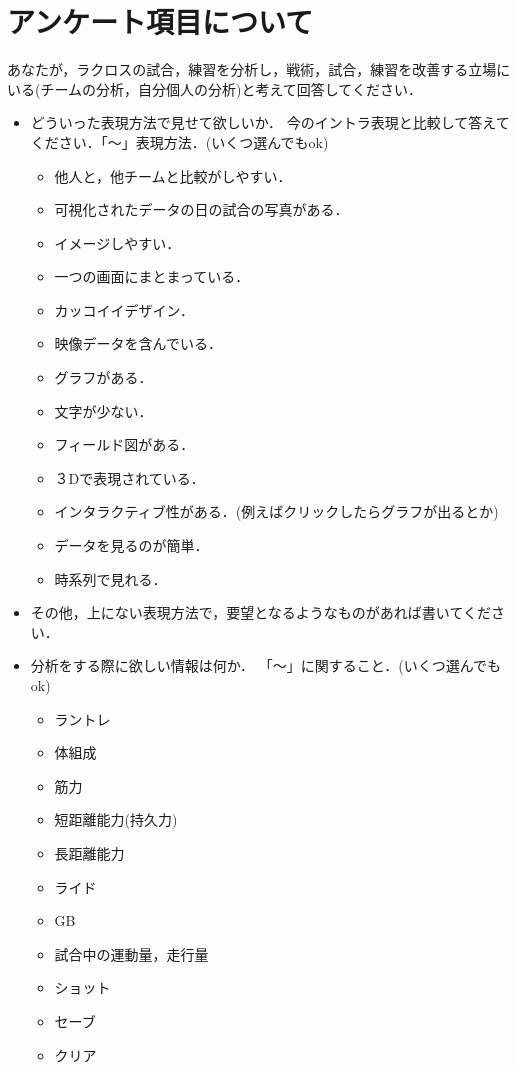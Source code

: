 \documentclass[sotsuron]{kuee}
\begin{document}
\chapter{アンケート項目について}
	あなたが，ラクロスの試合，練習を分析し，戦術，試合，練習を改善する立場にいる(チームの分析，自分個人の分析)と考えて回答してください．
	\begin{itemize}
		\item どういった表現方法で見せて欲しいか．
			今のイントラ表現と比較して答えてください．「〜」表現方法．(いくつ選んでもok)
			\begin{itemize}
				\item 他人と，他チームと比較がしやすい．
				\item 可視化されたデータの日の試合の写真がある．
				\item イメージしやすい．
				\item 一つの画面にまとまっている．
				\item カッコイイデザイン．
				\item 映像データを含んでいる．
				\item グラフがある．
				\item 文字が少ない．
				\item フィールド図がある．
				\item ３Dで表現されている．
				\item インタラクティブ性がある．(例えばクリックしたらグラフが出るとか)
				\item データを見るのが簡単．
				\item 時系列で見れる．
			\end{itemize}
		\item その他，上にない表現方法で，要望となるようなものがあれば書いてください．
		\item 分析をする際に欲しい情報は何か．
			「〜」に関すること．(いくつ選んでもok)
			\begin{itemize}
				\item ラントレ
				\item 体組成
				\item 筋力
				\item 短距離能力(持久力)
				\item 長距離能力
				\item ライド
				\item GB
				\item 試合中の運動量，走行量
				\item ショット
				\item セーブ
				\item クリア

\end{itemize}
\end{itemize}
\end{document}
